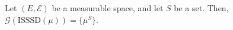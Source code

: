 \begin{lemma}
    \label{lem:exist_uniq_ISSSD_gibbsMeasures}
    Let $(E,\mathcal{E})$ be a measurable space, and let $S$ be a set. Then, $\mathcal{G}(\text{ISSSD}(\mu))=\{\mu^S\}$.
\end{lemma}

